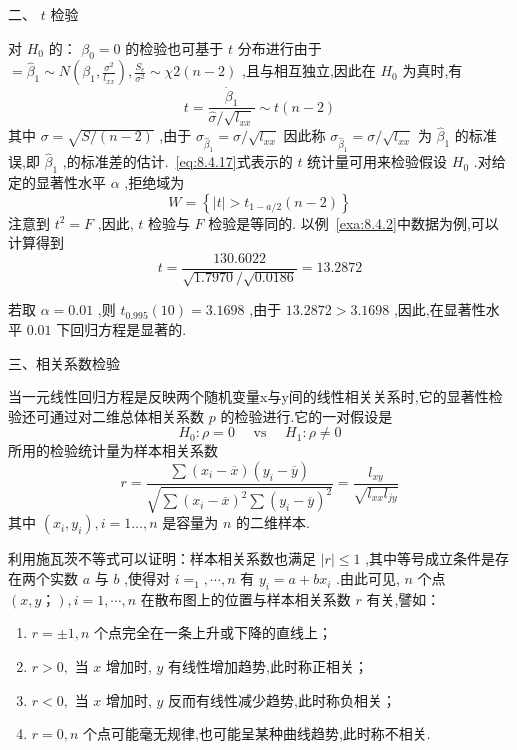 二、 $ t $ 检验

对 $ H_0 $ 的： $ \beta_0=0 $ 的检验也可基于 $ t $ 分布进行由于 $ =\hat{\beta}_{1} \sim N\left(\beta_{1}, \frac{\sigma^{2}}{l_{x x}}\right), \frac{S_{e}}{\sigma^{2}} \sim \chi 2(n-2) $ ,且与相互独立,因此在 $ H_0 $ 为真时,有
\begin{equation}
t=\frac{\dot{\beta}_{1}}{\hat{\sigma} / \sqrt{l_{x x}}} \sim t(n-2)\label{eq}
\end{equation}
其中 $ \sigma =\sqrt{S/(n-2)} $ ,由于 $ \sigma_{\hat{\beta}_1}=\sigma/\sqrt{l_{xx}} $ 因此称 $ \sigma_{\hat{\beta}_1}=\sigma/\sqrt{l_{xx}}  $ 为 $ \hat{\beta}_1 $ 的标准误,即 $ \hat{\beta}_1 $ ,的标准差的估计.~\ref{eq:8.4.17}式表示的 $ t $ 统计量可用来检验假设 $ H_0 $ .对给定的显著性水平 $ \alpha $ ,拒绝域为
\[
W=\left\{|t|>t_{1-a / 2}(n-2)\right\}
\]
注意到 $ t^2=F $ ,因此, $ t $ 检验与 $ F $ 检验是等同的.
以例~\ref{exa:8.4.2}中数据为例,可以计算得到
\[
t=\frac{130.6022}{\sqrt{1.7970} / \sqrt{0.0186}}=13.2872
\]

若取 $ \alpha=0.01 $ ,则 $ t_{0.995}(10)=3.1698 $ ,由于 $ 13.2872>3.1698 $ ,因此,在显著性水平 $ 0.01 $ 下回归方程是显著的.


三、相关系数检验

当一元线性回归方程是反映两个随机变量x与y间的线性相关关系时,它的显著性检验还可通过对二维总体相关系数 $ p $ 的检验进行.它的一对假设是
\begin{equation}
H_{0} : \rho=0 \quad \text { vs } \quad H_{1} : \rho \neq 0
\end{equation}
所用的检验统计量为样本相关系数
\begin{equation}
r=\frac{\sum\left(x_{i}-\overline{x}\right)\left(y_{i}-\overline{y}\right)}{\sqrt{\sum\left(x_{i}-\overline{x}\right)^{2} \sum\left(y_{i}-\overline{y}\right)^{2}}}=\frac{l_{x y}}{\sqrt{l_{x x} l_{j y}}}
\end{equation}
其中 $ (x_i,y_i),i=1…,n $ 是容量为 $ n $ 的二维样本.

利用施瓦茨不等式可以证明：样本相关系数也满足  $ \left| r \right|\le 1 $ ,其中等号成立条件是存在两个实数 $ a $ 与 $ b $ ,使得对 $ i=_1,\cdots,n $ 有 $ y_i=a+bx_i $ .由此可见, $ n $ 个点 $ (x,y；),i=1,\cdots,n $ 在散布图上的位置与样本相关系数 $ r $ 有关,譬如：

\begin{enumerate}
	\item  $ r=\pm 1,n $ 个点完全在一条上升或下降的直线上；
	\item  $ r>0 , $ 当 $ x $ 增加时, $ y $ 有线性增加趋势,此时称正相关；
	\item  $ r<0, $ 当 $ x $ 增加时, $ y $ 反而有线性减少趋势,此时称负相关；
	\item  $ r=0,n $ 个点可能毫无规律,也可能呈某种曲线趋势,此时称不相关.
\end{enumerate}



